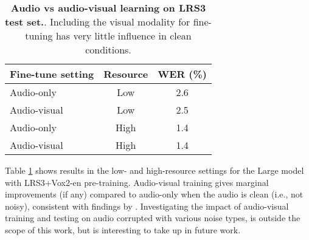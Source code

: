 \documentclass{article} \usepackage{iclr2023_conference,times}
\begin{document}
\begin{table}
\centering
\begin{tabular}[b]{l c | c}\toprule
Fine-tune setting & Resource & WER (\%) \\
\midrule
Audio-only & Low & 2.6 \\
Audio-visual & Low & 2.5 \\
Audio-only & High & 1.4 \\
Audio-visual & High & 1.4 \\
\bottomrule 
\end{tabular}
\caption{\textbf{Audio vs audio-visual learning on LRS3 test set.}. Including the visual modality for fine-tuning has very little influence in clean conditions.}
\label{table:audiovisual}
\end{table}

Table \ref{table:audiovisual} shows results in the low- and high-resource settings for the Large model with LRS3+Vox2-en pre-training. Audio-visual training gives marginal improvements (if any) compared to audio-only when the audio is clean (i.e., not noisy), consistent with findings by \citet{ma2021end}. Investigating the impact of audio-visual training and testing on audio corrupted with various noise types, is outside the scope of this work, but is interesting to take up in future work.
\end{document}
